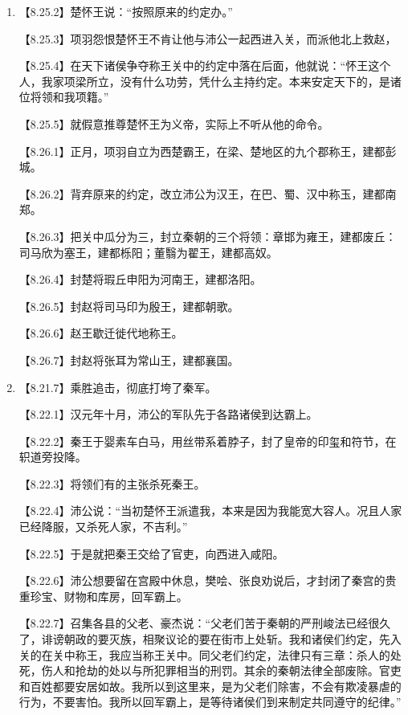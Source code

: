 \documentclass[fontset=none,11pt,a4paper]{ctexart}
\begin{document}
\begin{enumerate}[label=\Alph*.]
  \item
\noindent 【8.25.2】楚怀王说：“按照原来的约定办。”\par
\noindent 【8.25.3】项羽怨恨楚怀王不肯让他与沛公一起西进入关，而派他北上救赵，\par
\noindent 【8.25.4】在天下诸侯争夺称王关中的约定中落在后面，他就说：“怀王这个人，我家项梁所立，没有什么功劳，凭什么主持约定。本来安定天下的，是诸位将领和我项籍。”\par
\noindent 【8.25.5】就假意推尊楚怀王为义帝，实际上不听从他的命令。\par
\noindent 【8.26.1】正月，项羽自立为西楚霸王，在梁、楚地区的九个郡称王，建都彭城。\par
\noindent 【8.26.2】背弃原来的约定，改立沛公为汉王，在巴、蜀、汉中称玉，建都南郑。\par
\noindent 【8.26.3】把关中瓜分为三，封立秦朝的三个将领：章邯为雍王，建都废丘：司马欣为塞王，建都栎阳；董翳为翟王，建都高奴。\par
\noindent 【8.26.4】封楚将瑕丘申阳为河南王，建都洛阳。\par
\noindent 【8.26.5】封赵将司马印为殷王，建都朝歌。\par
\noindent 【8.26.6】赵王歇迁徙代地称王。\par
\noindent 【8.26.7】封赵将张耳为常山王，建都襄国。\par
  \item
\noindent 【8.21.7】乘胜追击，彻底打垮了秦军。\par
\noindent 【8.22.1】汉元年十月，沛公的军队先于各路诸侯到达霸上。\par
\noindent 【8.22.2】秦王于婴素车白马，用丝带系着脖子，封了皇帝的印玺和符节，在轵道旁投降。\par
\noindent 【8.22.3】将领们有的主张杀死秦王。\par
\noindent 【8.22.4】沛公说：“当初楚怀王派遣我，本来是因为我能宽大容人。况且人家已经降服，又杀死人家，不吉利。”\par
\noindent 【8.22.5】于是就把秦王交给了官吏，向西进入咸阳。\par
\noindent 【8.22.6】沛公想要留在宫殿中休息，樊哙、张良劝说后，才封闭了秦宫的贵重珍宝、财物和库房，回军霸上。\par
\noindent 【8.22.7】召集各县的父老、豪杰说：“父老们苦于秦朝的严刑峻法已经很久了，诽谤朝政的要灭族，相聚议论的要在街市上处斩。我和诸侯们约定，先入关的在关中称王，我应当称王关中。同父老们约定，法律只有三章：杀人的处死，伤人和抢劫的处以与所犯罪相当的刑罚。其余的秦朝法律全部废除。官吏和百姓都要安居如故。我所以到这里来，是为父老们除害，不会有欺凌暴虐的行为，不要害怕。我所以回军霸上，是等待诸侯们到来制定共同遵守的纪律。”\par

\end{enumerate}
\end{document}

